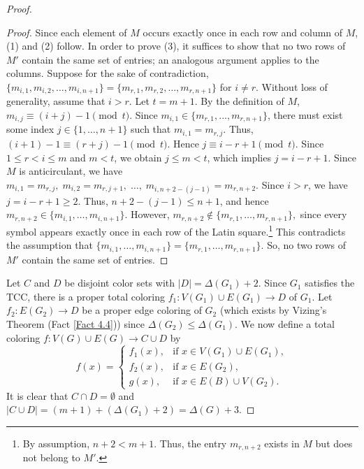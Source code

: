 \documentclass[12pt,reqno,a4paper]{amsart}
\theoremstyle{definition}
\theoremstyle{plain}
\begin{document}
\begin{proof}
\begin{proof}
Since each element of $M$ occurs exactly once in each row and column of $M$, (1) and (2) follow.
In order to prove (3), it suffices to show that no two rows of $M'$ contain the same set of entries; an analogous argument applies to the columns.
Suppose for the sake of contradiction,
$
\{m_{i,1}, m_{i,2}, \dots, m_{i,n+1}\}
=
\{m_{r,1}, m_{r,2}, \dots, m_{r,n+1}\}
$
for $i\neq r$. Without loss of generality, assume that $i>r$.
Let $t = m+1$. By the definition of $M$,
$
m_{i,j} \equiv (i + j)-1 \pmod{t}.
$
Since $m_{i,1}\in \{m_{r,1},...,m_{r,n+1}\}$, there must exist some index $j \in \{1, \dots, n+1\}$ such that $m_{i,1}=m_{r,j}$.
Thus, 
$
(i+1)-1 \equiv (r + j)-1 \pmod{t}.
$
Hence
$j \equiv i - r + 1 \pmod{t}.
$
Since $1 \le r<i \le m$ and $m < t$, we obtain $j \le m < t$, which implies
$
j = i - r + 1.
$
Since $M$ is anticirculant, we have
$
m_{i,1}=m_{r,j},\; m_{i,2}=m_{r,j+1},\; \dots,\; m_{i,n+2-(j-1)}=m_{r,n+2}.
$
Since $i>r$, we have
$
j=i-r+1\ge2.
$
Thus, $n+2-(j-1)\le n+1$, and hence $m_{r,n+2}\in\{m_{i,1},\dots,m_{i,n+1}\}$.
However,
$
m_{r,n+2}\notin\{m_{r,1},\dots,m_{r,n+1}\},
$
since every symbol appears exactly once in each row of the Latin square.\footnote{By assumption, $n+2<m+1$. Thus, the entry $m_{r,n+2}$ exists in $M$ but does not belong to $M'$.}
This contradicts the assumption that
$
\{m_{i,1},\dots,m_{i,n+1}\}
=
\{m_{r,1},\dots,m_{r,n+1}\}.
$
So, no two rows of $M'$ contain the same set of entries.
\end{proof}

Let $C$ and $D$ be disjoint color sets with $|D| = \Delta(G_1) + 2$. 
Since $G_1$ satisfies the TCC, there is a proper total coloring $f_1 : V(G_1)\cup E(G_1) \to D$ of $G_1$.
Let $f_2 : E(G_2) \to D$ be a proper edge coloring of $G_2$ 
(which exists by Vizing's Theorem (Fact \ref{Fact 4.4})) since $\Delta(G_2) \leq \Delta(G_1)$.
We now define a total coloring $f:V(G)\cup E(G)\rightarrow C\cup D$ by
\[
f(x)=
\begin{cases}
f_1(x), & \text{if } x\in V(G_1)\cup E(G_1),\\
f_2(x), & \text{if } x\in E(G_2),\\
g(x), & \text{if } x\in E(B)\cup V(G_2).
\end{cases}
\]
It is clear that $C\cap D=\emptyset$ and $|C\cup D|=(m+1)+(\Delta(G_1)+2)=\Delta(G)+3$.



\end{proof}
\end{document}

